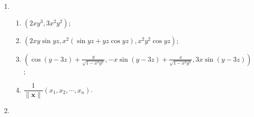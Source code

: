 \documentclass[a4paper, 11pt]{ctexart}
\begin{document}
\begin{enumerate}
    \item %
        \begin{enumerate}[(1)]
            \item %
                $(2xy^3, 3x^2y^2)$;
            \item %
                $(2xy\sin{yz}, x^2(\sin{yz}+yz\cos{yz}), x^2y^2\cos{yz})$;
            \item %
                $\displaystyle{
                    \left(
                        \cos(y-3z) + \frac{y}{\sqrt{1-x^2y^2}}, -x\sin(y-3z) + \frac{x}{\sqrt{1-x^2y^2}}, 3x\sin(y-3z)    
                    \right)
                }$;
            \item %
                $\dfrac{1}{\|\boldsymbol{x}\|}(x_1, x_2, \cdots, x_n)$.
        \end{enumerate}
    \item %
\end{enumerate}
\end{document}
